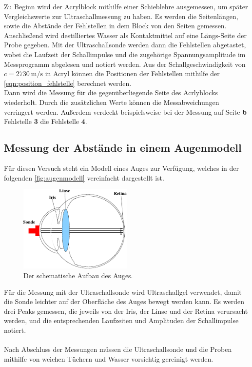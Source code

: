     Zu Beginn wird der Acrylblock mithilfe einer Schieblehre ausgemessen,
    um später Vergleichswerte zur Ultraschallmessung zu haben.
    Es werden die Seitenlängen,
    sowie die Abstände der Fehlstellen in dem Block von den Seiten gemessen.\\
    Anschließend wird destilliertes Wasser als Kontaktmittel auf eine Längs-Seite der Probe gegeben.
    Mit der Ultraschallsonde werden dann die Fehlstellen abgetastet,
    wobei die Laufzeit der Schallimpulse und die zugehörige Spannungsamplitude
    im Messprogramm abgelesen und notiert werden.
    Aus der Schallgeschwindigkeit von $c = \SI{2730}{\meter\per\second}$ in Acryl
    können die Positionen der Fehlstellen mithilfe der \autoref{eqn:position_fehlstelle} berechnet werden.\\
    Dann wird die Messung für die gegenüberliegende Seite des Acrlyblocks wiederholt.
    Durch die zusätzlichen Werte können die Messabweichungen verringert werden.
    Außerdem verdeckt beispielsweise bei der Messung auf Seite \textbf{b} Fehlstelle \textbf{3} die Fehlstelle \textbf{4}.

\subsection{Messung der Abstände in einem Augenmodell}

    Für diesen Versuch steht ein Modell eines Auges zur Verfügung,
    welches in der folgenden \autoref{fig:augenmodell} vereinfacht dargestellt ist.

    \begin{figure}[H]
        \centering
        \includegraphics[width=0.5\textwidth]{content/img/Abb_2.pdf}
        \caption{Der schematische Aufbau des Auges. \cite{versuchsanleitung}}
        \label{fig:augenmodell}
    \end{figure}

    Für die Messung mit der Ultraschallsonde wird Ultraschallgel verwendet,
    damit die Sonde leichter auf der Oberfläche des Auges bewegt werden kann.
    Es werden drei Peaks gemessen,
    die jeweils von der Iris, der Linse und der Retina verursacht werden,
    und die entsprechenden Laufzeiten und Amplituden der Schallimpulse notiert.\\
    \\
    Nach Abschluss der Messungen müssen die Ultraschallsonde und die Proben
    mithilfe von weichen Tüchern und Wasser vorsichtig gereinigt werden.
